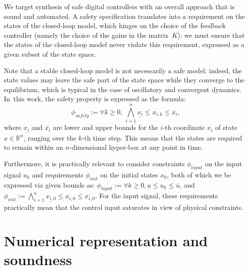 We target synthesis of safe digital controllers with an overall approach that is sound and automated.
A safety specification translates into a requirement on the states of the closed-loop model, 
which hinges on the choice of the feedback controller (namely the choice of the gains in the matrix~$K$):  
we must ensure that the states of the closed-loop model never violate this requirement, expressed as a given subset of the state space.  

Note that a stable closed-loop model is not necessarily a safe model: 
indeed, the state values may leave the safe part of the state space while they converge
to the equilibrium, which is typical in the case of oscillatory and convergent dynamics. 
In~this work, the safety property is expressed as the formula:
%
\begin{equation}
\label{eq:safetyliteral}
\phi_\mathit{safety} := \forall k\ge 0,\, \bigwedge_{i=1}^{n}{\underline{x_{i}} \leq x_{i,k} \leq \overline{x_{i}}},
\end{equation}
%
%
where $\underline{x_{i}}$ and $\overline{x_{i}}$ are lower and upper bounds
for the $i$-th coordinate $x_{i}$ of state $x\in \mathbb R^n$, ranging over the $k$-th time step.  
This means that the states are required to remain within an $n$-dimensional hyper-box at any point in time.  	

Furthermore, it is practically relevant to consider constraints $\phi_\mathit{input}$ on the input
signal $u_{k}$ and requirements $\phi_\mathit{init}$ on the initial states $x_0$, 
both of which we be expressed via given bounds as: 
$\phi_\mathit{input} := {\forall k\ge 0, \underline{u} \leq u_{k} \leq \overline{u}} $, 
and $\phi_\mathit{init} := \bigwedge_{i=1}^{n} \underline{x_{i,0}} \leq x_{i,0} \leq \overline{x_{i,0}}$. 
For the input signal, these requirements practically mean that the control input saturates in view of physical constraints. 
\fi

\section{Numerical representation and soundness} 
\label{sec:numeric_rep}

